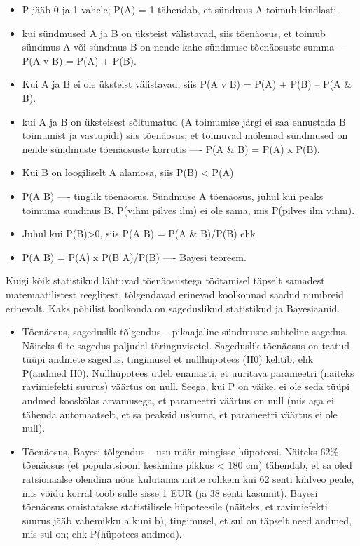 \documentclass[]{book}
\providecommand{\tightlist}{%
  \setlength{\itemsep}{0pt}\setlength{\parskip}{0pt}}
\begin{document}
\begin{itemize}
\tightlist
\item
  P jääb 0 ja 1 vahele; P(A) = 1 tähendab, et sündmus A toimub
  kindlasti.
\item
  kui sündmused A ja B on üksteist välistavad, siis tõenäosus, et toimub
  sündmus A või sündmus B on nende kahe sündmuse tõenäosuste summa ---
  P(A v B) = P(A) + P(B).
\item
  Kui A ja B ei ole üksteist välistavad, siis P(A v B) = P(A) + P(B) --
  P(A \& B).
\item
  kui A ja B on üksteisest sõltumatud (A toimumise järgi ei saa
  ennustada B toimumist ja vastupidi) siis tõenäosus, et toimuvad
  mõlemad sündmused on nende sündmuste tõenäosuste korrutis ---- P(A \&
  B) = P(A) x P(B).
\item
  Kui B on loogiliselt A alamosa, siis P(B) \textless{} P(A)
\item
  P(A \textbar{} B) ---- tinglik tõenäosus. Sündmuse A tõenäosus, juhul
  kui peaks toimuma sündmus B. P(vihm \textbar{} pilves ilm) ei ole
  sama, mis P(pilves ilm \textbar{} vihm).
\item
  Juhul kui P(B)\textgreater{}0, siis P(A \textbar{} B) = P(A \& B)/P(B)
  ehk
\item
  P(A \textbar{} B) = P(A) x P(B \textbar{} A)/P(B) ---- Bayesi teoreem.
\end{itemize}

Kuigi kõik statistikud lähtuvad tõenäosustega töötamisel täpselt
samadest matemaatilistest reeglitest, tõlgendavad erinevad koolkonnad
saadud numbreid erinevalt. Kaks põhilist koolkonda on sageduslikud
statistikud ja Bayesiaanid.

\begin{itemize}
\item
  Tõenäosus, sageduslik tõlgendus -- pikaajaline sündmuste suhteline
  sagedus. Näiteks 6-te sagedus paljudel täringuvisetel. Sageduslik
  tõenäosus on teatud tüüpi andmete sagedus, tingimusel et nullhüpotees
  (H0) kehtib; ehk P(andmed \textbar{} H0). Nullhüpotees ütleb enamasti,
  et uuritava parameetri (näiteks ravimiefekti suurus) väärtus on null.
  Seega, kui P on väike, ei ole seda tüüpi andmed kooskõlas arvamusega,
  et parameetri väärtus on null (mis aga ei tähenda automaatselt, et sa
  peaksid uskuma, et parameetri väärtus ei ole null).
\item
  Tõenäosus, Bayesi tõlgendus -- usu määr mingisse hüpoteesi. Näiteks
  62\% tõenäosus (et populatsiooni keskmine pikkus \textless{} 180 cm)
  tähendab, et sa oled ratsionaalse olendina nõus kulutama mitte rohkem
  kui 62 senti kihlveo peale, mis võidu korral toob sulle sisse 1 EUR
  (ja 38 senti kasumit). Bayesi tõenäosus omistatakse statistilisele
  hüpoteesile (näiteks, et ravimiefekti suurus jääb vahemikku a kuni b),
  tingimusel, et sul on täpselt need andmed, mis sul on; ehk P(hüpotees
  \textbar{} andmed).
\end{itemize}
\end{document}
